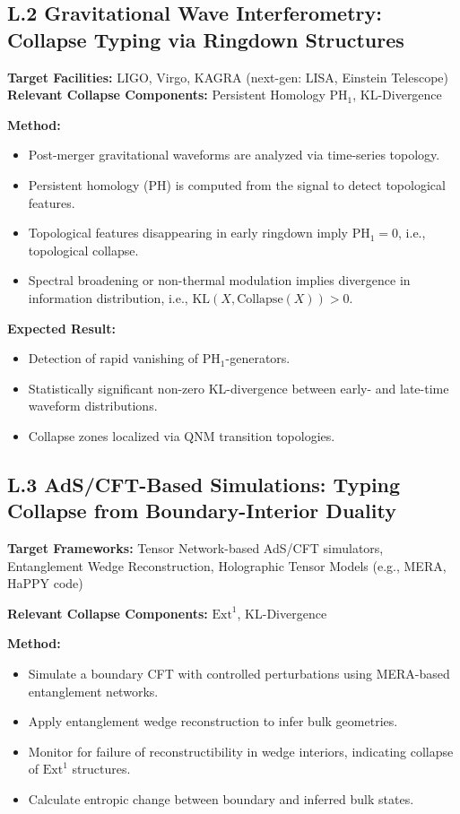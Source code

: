 \documentclass[11pt]{article}
\begin{document}
\subsection*{L.2 Gravitational Wave Interferometry: Collapse Typing via Ringdown Structures}

\textbf{Target Facilities:} LIGO, Virgo, KAGRA (next-gen: LISA, Einstein Telescope) \\
\textbf{Relevant Collapse Components:} Persistent Homology \( \mathrm{PH}_1 \), KL-Divergence

\textbf{Method:}
\begin{itemize}
    \item Post-merger gravitational waveforms are analyzed via time-series topology.
    \item Persistent homology (PH) is computed from the signal to detect topological features.
    \item Topological features disappearing in early ringdown imply \( \mathrm{PH}_1 = 0 \), i.e., topological collapse.
    \item Spectral broadening or non-thermal modulation implies divergence in information distribution, i.e., \( \mathrm{KL}(X, \mathrm{Collapse}(X)) > 0 \).
\end{itemize}

\textbf{Expected Result:}
\begin{itemize}
    \item Detection of rapid vanishing of \( \mathrm{PH}_1 \)-generators.
    \item Statistically significant non-zero KL-divergence between early- and late-time waveform distributions.
    \item Collapse zones localized via QNM transition topologies.
\end{itemize}

\subsection*{L.3 AdS/CFT-Based Simulations: Typing Collapse from Boundary-Interior Duality}

\textbf{Target Frameworks:} Tensor Network-based AdS/CFT simulators, Entanglement Wedge Reconstruction, Holographic Tensor Models (e.g., MERA, HaPPY code)

\textbf{Relevant Collapse Components:} \( \mathrm{Ext}^1 \), KL-Divergence

\textbf{Method:}
\begin{itemize}
    \item Simulate a boundary CFT with controlled perturbations using MERA-based entanglement networks.
    \item Apply entanglement wedge reconstruction to infer bulk geometries.
    \item Monitor for failure of reconstructibility in wedge interiors, indicating collapse of \( \mathrm{Ext}^1 \) structures.
    \item Calculate entropic change between boundary and inferred bulk states.
\end{itemize}
\end{document}
